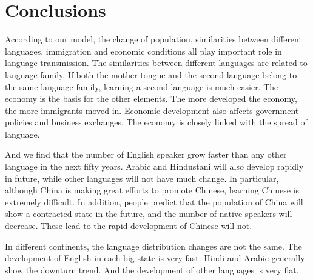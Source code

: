 \documentclass{mcmthesis}
\begin{document}




  \section{Conclusions}
  According to our model, the change of population, similarities between different languages, immigration and economic conditions all play important role in language transmission.
  The similarities between different languages are related to language family.
  If both the mother tongue and the second language belong to the same language family, learning a second language is much easier.
  The economy is the basis for the other elements.
  The more developed the economy, the more immigrants moved in.
  Economic development also affects government policies and business exchanges.
  The economy is closely linked with the spread of language.

  And we find that the number of English speaker grow faster than any other language in the next fifty years.
  Arabic and Hindustani will also develop rapidly in future,
  while other languages will not have much change.
  In particular, although China is making great efforts to promote Chinese,
  learning Chinese is extremely difficult.
  In addition, people predict that the population of China will show a contracted state in the future, and the number of native speakers will decrease.
  These lead to the rapid development of Chinese will not.

  In different continents, the language distribution changes are not the same.
  The development of English in each big state is very fast.
  Hindi and Arabic generally show the downturn trend.
  And the development of other languages is very flat.
\end{document}

